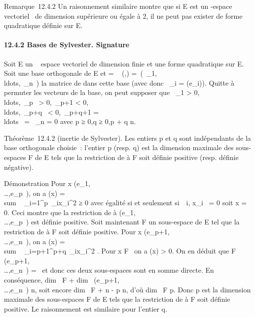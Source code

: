 \documentclass[]{article}
\begin{document}
Remarque~12.4.2 Un raisonnement similaire montre que si E est un
-espace vectoriel ~de dimension supérieure ou égale à 2, il ne peut pas
exister de forme quadratique définie sur E.

\paragraph{12.4.2 Bases de Sylvester. Signature}

Soit E un ~ espace vectoriel de dimension finie et \Phi une forme
quadratique sur E. Soit  une base orthogonale de E et \Omega
= \mathrmMat~ (\Phi,)
=\
\mathrmdiag(\alpha~\_1,\\ldots,\alpha~\_n~)
la matrice de \Phi dans cette base (avec donc \alpha~\_i =
\Phi(e\_i)). Quitte à permuter les vecteurs de la base, on peut
supposer que \alpha~\_1 \textgreater{}
0,\\ldots,\alpha~\_p~
\textgreater{} 0,\alpha~\_p+1 \textless{}
0,\\ldots,\alpha~\_p+q~
\textless{} 0,\alpha~\_p+q+1 =
\\ldots~ =
\alpha~\_n = 0 avec p ≥ 0,q ≥ 0,p + q \leq n.

Théorème~12.4.2 (inertie de Sylvester). Les entiers p et q sont
indépendants de la base orthogonale choisie~: l'entier p (resp. q) est
la dimension maximale des sous-espaces F de E tels que la restriction de
\Phi à F soit définie positive (resp. définie négative).

Démonstration Pour x
\in\mathrmVect(e\_1,\\\ldots,e\_p~),
on a \Phi(x) = \\sum ~
\_i=1^p\alpha~\_ix\_i^2 ≥ 0 avec égalité
si et seulement si~\forall~i, x\_i~ = 0 soit x
= 0. Ceci montre que la restriction de \Phi à
\mathrmVect(e\_1,\\\ldots,e\_p~)
est définie positive. Soit maintenant F un sous-espace de E tel que la
restriction de \Phi à F soit définie positive. Pour x
\in\mathrmVect(e\_p+1,\\\ldots,e\_n~),
on a \Phi(x) = \\sum ~
\_i=p+1^p+q\alpha~\_ix\_i^2 . Pour x \in
F \diagdown\0\ on a \Phi(x) \textgreater{} 0. On
en déduit que F
\bigcap\mathrmVect(e\_p+1,\\\ldots,e\_n~)
= \0\ et donc ces deux sous-espaces
sont en somme directe. En conséquence, dim~ F
+ dim~
\mathrmVect(e\_p+1,\\\ldots,e\_n~)
\leq n, soit encore dim~ F + n - p \leq n, d'où
dim~ F \leq p. Donc p est la dimension maximale
des sous-espaces F de E tels que la restriction de \Phi à F soit définie
positive. Le raisonnement est similaire pour l'entier q.
\end{document}
